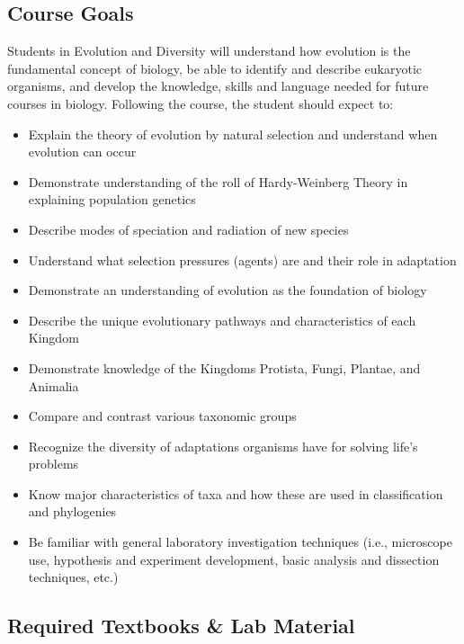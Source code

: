\documentclass{tufte-handout}
\begin{document}
\begin{fullwidth}

\subsection{Course Goals}

Students in Evolution and Diversity will understand how evolution is the fundamental concept of biology, be able to identify and describe eukaryotic organisms, and develop the knowledge, skills and language needed for future courses in biology. Following the course, the student should expect to:

\begin{itemize}
	\item Explain the theory of evolution by natural selection and understand when evolution can occur
	\item Demonstrate understanding of the roll of Hardy-Weinberg Theory in explaining population genetics
	\item Describe modes of speciation and radiation of new species
	\item Understand what selection pressures (agents) are and their role in adaptation
	\item Demonstrate an understanding of evolution as the foundation of biology
	\item Describe the unique evolutionary pathways and characteristics of each Kingdom
	\item Demonstrate knowledge of the Kingdoms Protista, Fungi, Plantae, and Animalia
	\item Compare and contrast various taxonomic groups
	\item Recognize the diversity of adaptations organisms have for solving life's problems
	\item Know major characteristics of taxa and how these are used in classification and phylogenies
	\item Be familiar with general laboratory investigation techniques (i.e., microscope use, hypothesis and experiment development, basic analysis and dissection techniques, etc.)
\end{itemize}

\subsection{Required Textbooks \& Lab Material}


\end{fullwidth}
\end{document}
